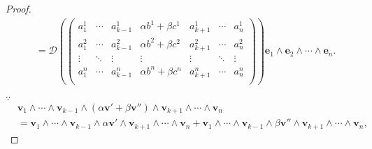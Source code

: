 \documentclass[color=black,device=normal,lang=cn,mode=geye]{elegantnote}
\begin{document}
\begin{proof}
\begin{align*}
        & =\mathcal{D}\left(\begin{pmatrix}
            a_1^1 & \cdots & a_{k-1}^1 & \alpha b^1+\beta c^1 & a_{k+1}^1 & \cdots & a_n^1 \\
            a_1^2 & \cdots & a_{k-1}^2 & \alpha b^2+\beta c^2 & a_{k+1}^2 & \cdots & a_n^2 \\
            \vdots & \ddots & \vdots & \vdots & \vdots & \ddots & \vdots \\
            a_1^n & \cdots & a_{k-1}^n & \alpha b^n+\beta c^n & a_{k+1}^n & \cdots & a_n^n \\
        \end{pmatrix}\right)\boldsymbol{e}_1\wedge\boldsymbol{e}_2\wedge\cdots\wedge\boldsymbol{e}_n.
    \end{align*}

    $\because$
    \begin{align*}
        & \boldsymbol{v}_1\wedge\cdots\wedge\boldsymbol{v}_{k-1}\wedge(\alpha\boldsymbol{v}'+\beta\boldsymbol{v}'')\wedge\boldsymbol{v}_{k+1}\wedge\cdots\wedge\boldsymbol{v}_n \\
        & =\boldsymbol{v}_1\wedge\cdots\wedge\boldsymbol{v}_{k-1}\wedge\alpha\boldsymbol{v}'\wedge\boldsymbol{v}_{k+1}\wedge\cdots\wedge\boldsymbol{v}_n+\boldsymbol{v}_1\wedge\cdots\wedge\boldsymbol{v}_{k-1}\wedge\beta\boldsymbol{v}''\wedge\boldsymbol{v}_{k+1}\wedge\cdots\wedge\boldsymbol{v}_n,
    \end{align*}


\end{proof}
\end{document}
